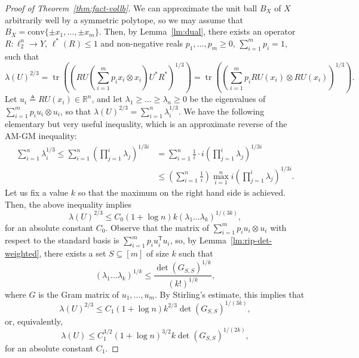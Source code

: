 \documentclass[11pt]{article}
\newcommand{\R}{{\mathbb{R}}}
\newcommand{\T}{\mathsf T}
\newcommand{\eqdef}{\triangleq}
\DeclareMathOperator{\tr}{tr}
\begin{document}
\begin{proof}[Proof of Theorem~\ref{thm:fact-vollb}]
  We can approximate the unit ball $B_X$ of $X$ arbitrarily well by a
  symmetric polytope, so we may assume that $B_X = \mathrm{conv}\{\pm
  x_1, \ldots, \pm x_m\}$. Then, by Lemma~\ref{lm:dual}, there exists an
  operator $R: \ell_2^n \to Y$, $\ell^*(R) \le 1$ and non-negative
  reals $p_1, \ldots, p_m \ge 0$, $\sum_{i = 1}^m{p_i} = 1$, such that
  \[
  \lambda(U)^{2/3} 
  = \tr((RU(\sum_{i = 1}^m{p_i x_i  \otimes  x_i})U^*R^*)^{1/3})
  = \tr((\sum_{i = 1}^m{p_i RU(x_i)  \otimes  RU(x_i)})^{1/3}).
  \]
  Let $u_i \eqdef RU(x_i) \in \R^n$, and let $\lambda_1 \ge \ldots \ge
  \lambda_n \ge 0$ be the eigenvalues of $\sum_{i = 1}^m{p_i u_i
    \otimes u_i}$, so that $\lambda(U)^{2/3} = \sum_{i =
    1}^n{\lambda_i^{1/3}}$. We have the following elementary but very useful
  inequality, which is an approximate reverse of the AM-GM inequality:
  \begin{align*}
  \sum_{i = 1}^n{\lambda_i^{1/3}} \le 
  \sum_{i = 1}^n{\left(\prod_{j = 1}^i{\lambda_j}\right)^{1/3i}}
  &= \sum_{i = 1}^n{\frac{1}{i} \cdot i\left(\prod_{j =   1}^i{\lambda_j}\right)^{1/3i}}\\
  &\le \left(\sum_{i = 1}^n{\frac{1}{i}}\right) 
  \max_{i = 1}^n{i\left(\prod_{j =   1}^i{\lambda_j}\right)^{1/3i}}.
  \end{align*}
  Let us fix a value $k$ so that the maximum on the right hand side is
  achieved. Then, the above inequality implies
  \[
  \lambda(U)^{2/3} \le C_0 (1+\log n) k (\lambda_1 \ldots \lambda_k)^{1/(3k)},
  \]
  for an absolute constant $C_0$. Observe that the matrix of $\sum_{i
    = 1}^m{p_i u_i \otimes u_i}$ with respect to the standard basis is
  $\sum_{i = 1}^m{p_i u_i^\T u_i}$, so, by
  Lemma~\ref{lm:rip-det-weighted},  there exists a set $S
  \subseteq [m]$ of size $k$ such that
  \[
  (\lambda_1 \ldots \lambda_k)^{1/k} \le
  \frac{\det(G_{S,S})^{1/k}}{(k!)^{1/k}},
  \]
  where $G$ is the Gram matrix of $u_1, \ldots, u_m$. By Stirling's
  estimate, this implies that 
  \begin{equation*}
  \lambda(U)^{2/3} \le C_1 (1+\log n) k^{2/3} \det(G_{S,S})^{1/(3k)},
  \end{equation*}
  or, equivalently,
  \begin{equation}\label{eq:fact-det}
  \lambda(U)\le  C_1^{3/2} (1+\log n)^{3/2} k \det(G_{S,S})^{1/(2k)},
  \end{equation}
  for an absolute constant $C_1$. 


\end{proof}
\end{document}
